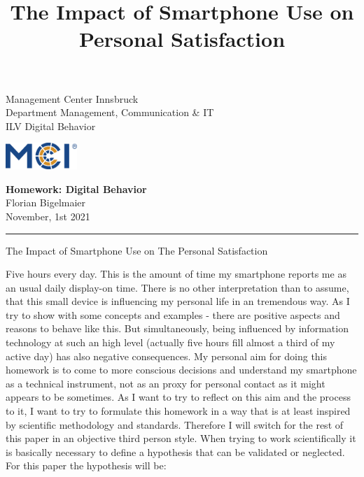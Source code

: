 \documentclass[11pt,letterpaper]{article}
\newcommand{\fontsmall}{\fontsize{7pt}{10pt}\selectfont}
\newcommand{\fontnormal}{\fontsize{11pt}{16pt}\selectfont}
\newcommand{\headline}{\fontsize{17pt}{26pt}\selectfont}
\begin{document}
   \title{The Impact of Smartphone Use on Personal Satisfaction} 



\noindent\begin{minipage}{0.5\textwidth}
\fontsmall
Management Center Innsbruck \\
Department Management, Communication \& IT  \\
ILV Digital Behavior


\end{minipage}%
\hfill%
\begin{minipage}{0.3\textwidth}\raggedleft
\includegraphics[height=1.0cm]{mci-logo.png}

\end{minipage}


 
\begin{center}
\textbf{Homework: Digital Behavior}\\   %
Florian Bigelmaier\\                         %
November, 1st 2021\\                         %
\end{center}
\rule{\linewidth}{0.1mm}




\headline \begin{center}
The Impact of Smartphone Use on The Personal Satisfaction
\end{center} 
\fontnormal 
Five hours every day. This is the amount of time my smartphone reports me as an usual daily display-on time. There is no other interpretation than to assume, that this small device is influencing my personal life in an tremendous way. As I try to show with some concepts and examples - there are positive aspects and reasons to behave like this. But simultaneously, being influenced by information technology at such an high level (actually five hours fill almost a third of my active day) has also negative consequences. My personal aim for doing this homework is to come to more conscious decisions and understand my smartphone as a technical instrument, not as an proxy for personal contact as it might appears to be sometimes. As I want to try to reflect on this aim and the process to it, I want to try to formulate this homework in a way that is at least inspired by scientific methodology and standards. Therefore I will switch for the rest of this paper in an objective third person style. When trying to work scientifically it is basically necessary to define a hypothesis that can be validated or neglected. For this paper the hypothesis will be:
\end{document}
